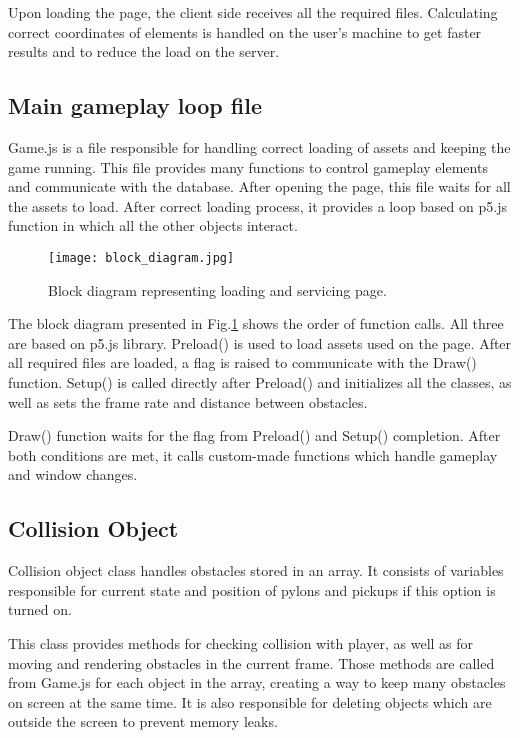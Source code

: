 \documentclass[oneside,a4paper,11pt]{report}
\begin{document}
Upon loading the page, the client side receives all the required files. Calculating correct coordinates of elements is handled on the user's machine to get faster results and to reduce the load on the server.

\subsection{Main gameplay loop file}
Game.js is a file responsible for handling correct loading of assets and keeping the game running. This file provides many functions to control gameplay elements and communicate with the database. After opening the page, this file waits for all the assets to load. After correct loading process, it provides a loop based on p5.js function in which all the other objects interact.

\begin{figure}
	\centering
	\texttt{[image: block\_diagram.jpg]}
	\caption{Block diagram representing loading and servicing page.\label{fig:block_diagram}}
\end{figure}

\par
The block diagram presented in Fig.\ref{fig:block_diagram} shows the order of function calls. All three are based on p5.js library. Preload() is used to load assets used on the page. After all required files are loaded, a flag is raised to communicate with the Draw() function. Setup() is called directly after Preload() and initializes all the classes, as well as sets the frame rate and distance between obstacles.

\par
Draw() function waits for the flag from Preload() and Setup() completion. After both conditions are met, it calls custom-made functions which handle gameplay and window changes.

\subsection{Collision Object}

Collision object class handles obstacles stored in an array. It consists of variables responsible for current state and position of pylons and pickups if this option is turned on.

\par
This class provides methods for checking collision with player, as well as for moving and rendering obstacles in the current frame. Those methods are called from Game.js for each object in the array, creating a way to keep many obstacles on screen at the same time. It is also responsible for deleting objects which are outside the screen to prevent memory leaks.
\end{document}

